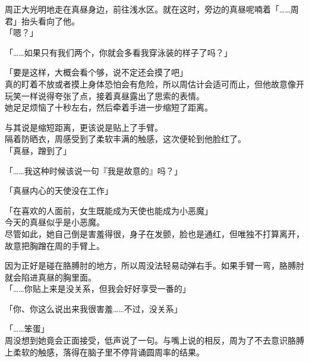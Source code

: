 周正大光明地走在真昼身边，前往浅水区。就在这时，旁边的真昼呢喃着「……周君」抬头看向了他。\\

「嗯？」

「……如果只有我们两个，你就会多看我穿泳装的样子了吗？」

「要是这样，大概会看个够，说不定还会摸了吧」\\

真的盯着不放或者摸上身体恐怕会有危险，所以周估计会适可而止，但他故意像开玩笑一样说得夸张了点，接着真昼露出了思索的表情。\\

她足足烦恼了十秒左右，然后牵着手进一步缩短了距离。

与其说是缩短距离，更该说是贴上了手臂。\\

隔着防晒衣，周感受到了柔软丰满的触感，这次便轮到他脸红了。\\

「真昼，蹭到了」

「……我这种时候该说一句『我是故意的』吗？」

「真昼内心的天使没在工作」

「在喜欢的人面前，女生既能成为天使也能成为小恶魔」\\

今天的真昼似乎是小恶魔。\\

尽管如此，她自己倒是害羞得很，身子在发颤，脸也是通红，但唯独不打算离开，故意把胸蹭在周的手臂上。

因为正好是碰在胳膊肘的地方，所以周没法轻易动弹右手。如果手臂一弯，胳膊肘就会陷进真昼的胸里面。\\

「……你贴上来是没关系，但我会好好享受一番的」

「你、你这么说出来我很害羞……不过，没关系」

「……笨蛋」\\

周没想到她竟会正面接受，低声说了一句。与嘴上说的相反，周为了不去意识胳膊上柔软的触感，落得在脑子里不停背诵圆周率的结果。
